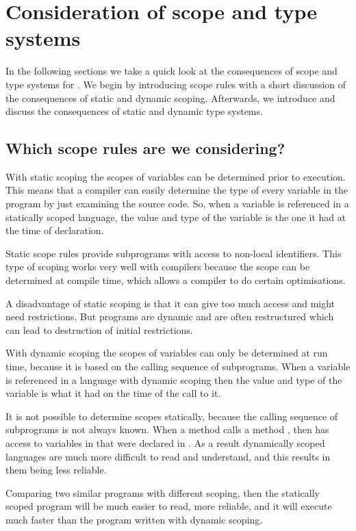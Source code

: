 \section{Consideration of scope and type systems}
\label{sec:anal-scoperules}
In the following sections we take a quick look at the consequences of scope and
type systems for \productname{}. We begin by introducing scope rules with a
short discussion of the consequences of static and dynamic scoping. Afterwards,
we introduce and discuss the consequences of static and dynamic type systems.

\subsection{Which scope rules are we considering?}

With static scoping the scopes of variables can be determined prior to
execution. This means that a compiler can easily determine the type of every
variable in the program by just examining the source code. So, when a variable
is referenced in a statically scoped language, the value and type of the
variable is the one it had at the time of declaration.

Static scope rules provide subprograms with access to non-local identifiers.
This type of scoping works very well with compilers because the scope can be
determined at compile time, which allows a compiler to do certain optimisations.

A disadvantage of static scoping is that it can give too much access and might
need restrictions. But programs are dynamic and are often restructured which can
lead to destruction of initial restrictions.

With dynamic scoping the scopes of variables can only be determined at run time,
because it is based on the calling sequence of subprograms.  When a variable is
referenced in a language with dynamic scoping then the value and type of the
variable is what it had on the time of the call to it\cite[p.
227]{sebesta2013}.

It is not possible to determine scopes statically, because the calling sequence
of subprograms is not always known. When a method  calls a method
, then  has access to variables in that were declared
in . As a result dynamically scoped languages are much more
difficult to read and understand, and this results in them being less reliable.

Comparing two similar programs with different scoping, then the statically
scoped program will be much easier to read, more reliable, and it will execute
much faster than the program written with dynamic scoping\cite[p. 229]{sebesta2013}.


